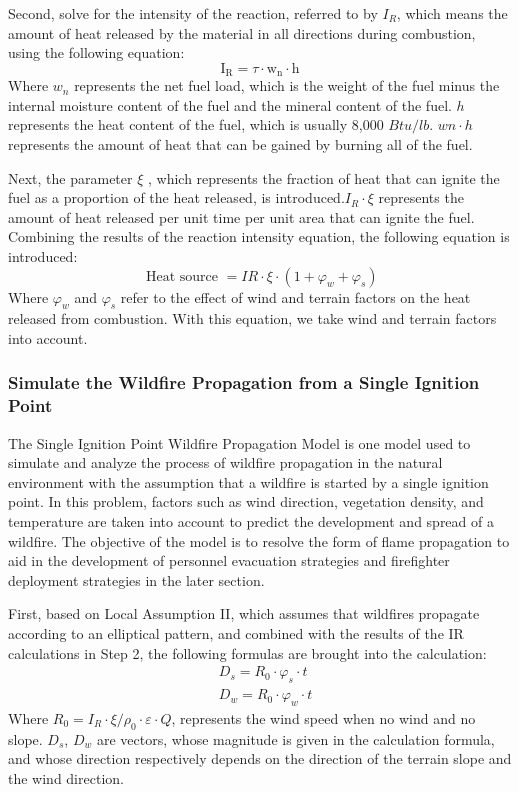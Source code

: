 \documentclass[12pt]{article}  %
\begin{document}
Second, solve for the intensity of the reaction, referred to by $I_R$, which means the amount of heat released by the material in all directions during combustion, using the following equation:
\begin{equation}
	\mathrm{I_R}=\tau\cdot \mathrm{w_n}\cdot \mathrm{h}
\end{equation}
Where $w_n$ represents the net fuel load, which is the weight of the fuel minus the internal moisture content of the fuel and the mineral content of the fuel. $h$ represents the heat content of the fuel, which is usually 8,000 $Btu/lb$. $wn\cdot h$ represents the amount of heat that can be gained by burning all of the fuel.

Next, the parameter $\xi$ , which represents the fraction of heat that can ignite the fuel as a proportion of the heat released, is introduced.$I_R\cdot \xi$ represents the amount of heat released per unit time per unit area that can ignite the fuel. Combining the results of the reaction intensity equation, the following equation is introduced:
\begin{equation}
	\text { Heat source }= IR \cdot \xi\cdot(1+\varphi_w+\varphi_s)
\end{equation}
Where $\varphi_w$ and $\varphi_s$ refer to the effect of wind and terrain factors on the heat released from combustion. With this equation, we take wind and terrain factors into account.

\subsubsection{Simulate the Wildfire Propagation from a Single Ignition Point}
The Single Ignition Point Wildfire Propagation Model is one model used to simulate and analyze the process of wildfire propagation in the natural environment with the assumption that a wildfire is started by a single ignition point. In this problem, factors such as wind direction, vegetation density, and temperature are taken into account to predict the development and spread of a wildfire. The objective of the model is to resolve the form of flame propagation to aid in the development of personnel evacuation strategies and firefighter deployment strategies in the later section.

First, based on Local Assumption II, which assumes that wildfires propagate according to an elliptical pattern, and combined with the results of the IR calculations in Step 2, the following formulas are brought into the calculation:
\begin{equation}
	\begin{aligned}
		& D_s=R_0\cdot  \varphi_s\cdot t \\
		& D_w=R_0\cdot  \varphi_w\cdot t
	\end{aligned}
\end{equation}
Where $R_0 = I_R\cdot \xi / \rho_0\cdot \varepsilon \cdot Q$, represents the wind speed when no wind and no slope. $D_s$, $D_w$ are vectors, whose magnitude is given in the calculation formula, and whose direction respectively depends on the direction of the terrain slope and the wind direction.
\end{document}

